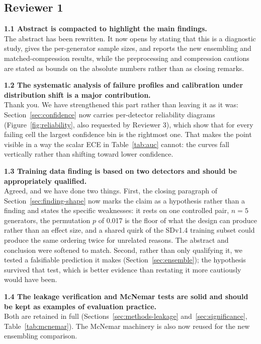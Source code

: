 \documentclass[3p,times,procedia]{elsarticle}
\begin{document}
\subsection*{Reviewer 1}

\noindent\textbf{1.1 Abstract is compacted to highlight the main findings.}\\[1pt]
The abstract has been rewritten. It now opens by stating that this is a
diagnostic study, gives the per-generator sample sizes, and reports the
new ensembling and matched-compression results, while the preprocessing
and compression cautions are stated as bounds on the absolute numbers
rather than as closing remarks.

\noindent\textbf{1.2 The systematic analysis of failure profiles and
calibration under distribution shift is a major contribution.}\\[1pt]
Thank you. We have strengthened this part rather than leaving it as it
was: Section~\ref{sec:confidence} now carries per-detector reliability
diagrams (Figure~\ref{fig:reliability}, also requested by Reviewer 3),
which show that for every failing cell the largest confidence bin is the
rightmost one. That makes the point visible in a way the scalar ECE in
Table~\ref{tab:auc} cannot: the curves fall vertically rather than
shifting toward lower confidence.

\noindent\textbf{1.3 Training data finding is based on two detectors and
should be appropriately qualified.}\\[1pt]
Agreed, and we have done two things. First, the closing paragraph of
Section~\ref{sec:finding-shape} now marks the claim as a hypothesis rather
than a finding and states the specific weaknesses: it rests on one
controlled pair, $n=5$ generators, the permutation $p$ of 0.017 is the
floor of what the design can produce rather than an effect size, and a
shared quirk of the SDv1.4 training subset could produce the same ordering
twice for unrelated reasons. The abstract and conclusion were softened to
match. Second, rather than only qualifying it, we tested a falsifiable
prediction it makes (Section~\ref{sec:ensemble}); the hypothesis survived
that test, which is better evidence than restating it more cautiously
would have been.

\noindent\textbf{1.4 The leakage verification and McNemar tests are solid
and should be kept as examples of evaluation practice.}\\[1pt]
Both are retained in full (Sections~\ref{sec:methods-leakage}
and~\ref{sec:significance}, Table~\ref{tab:mcnemar}). The McNemar
machinery is also now reused for the new ensembling comparison.
\end{document}
